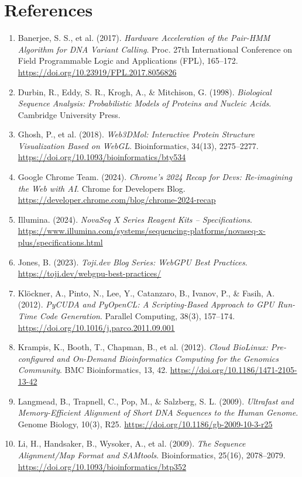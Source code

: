 \documentclass[12pt]{report}
\begin{document}
\chapter{References}
\begin{enumerate}
    \item Banerjee, S. S., et al. (2017). \emph{Hardware Acceleration of the Pair-HMM Algorithm for DNA Variant Calling}. Proc. 27th International Conference on Field Programmable Logic and Applications (FPL), 165–172. \url{https://doi.org/10.23919/FPL.2017.8056826}
    \item Durbin, R., Eddy, S. R., Krogh, A., \& Mitchison, G. (1998). \emph{Biological Sequence Analysis: Probabilistic Models of Proteins and Nucleic Acids}. Cambridge University Press.
    \item Ghosh, P., et al. (2018). \emph{Web3DMol: Interactive Protein Structure Visualization Based on WebGL}. Bioinformatics, 34(13), 2275–2277. \url{https://doi.org/10.1093/bioinformatics/bty534}
    \item Google Chrome Team. (2024). \emph{Chrome’s 2024 Recap for Devs: Re-imagining the Web with AI}. Chrome for Developers Blog. \url{https://developer.chrome.com/blog/chrome-2024-recap}
    \item Illumina. (2024). \emph{NovaSeq X Series Reagent Kits – Specifications}. \url{https://www.illumina.com/systems/sequencing-platforms/novaseq-x-plus/specifications.html}
    \item Jones, B. (2023). \emph{Toji.dev Blog Series: WebGPU Best Practices}. \url{https://toji.dev/webgpu-best-practices/}
    \item Klöckner, A., Pinto, N., Lee, Y., Catanzaro, B., Ivanov, P., \& Fasih, A. (2012). \emph{PyCUDA and PyOpenCL: A Scripting-Based Approach to GPU Run-Time Code Generation}. Parallel Computing, 38(3), 157–174. \url{https://doi.org/10.1016/j.parco.2011.09.001}
    \item Krampis, K., Booth, T., Chapman, B., et al. (2012). \emph{Cloud BioLinux: Pre-configured and On-Demand Bioinformatics Computing for the Genomics Community}. BMC Bioinformatics, 13, 42. \url{https://doi.org/10.1186/1471-2105-13-42}
    \item Langmead, B., Trapnell, C., Pop, M., \& Salzberg, S. L. (2009). \emph{Ultrafast and Memory-Efficient Alignment of Short DNA Sequences to the Human Genome}. Genome Biology, 10(3), R25. \url{https://doi.org/10.1186/gb-2009-10-3-r25}
    \item Li, H., Handsaker, B., Wysoker, A., et al. (2009). \emph{The Sequence Alignment/Map Format and SAMtools}. Bioinformatics, 25(16), 2078–2079. \url{https://doi.org/10.1093/bioinformatics/btp352}

\end{enumerate}
\end{document}
